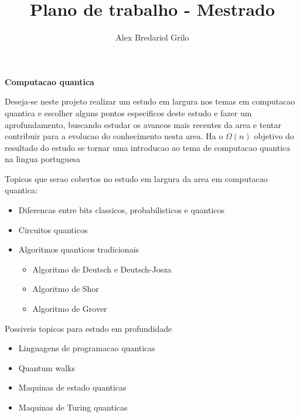 \documentclass[a4paper,10pt]{article}
\title{Plano de trabalho - Mestrado}
\author{Alex Bredariol Grilo}
\begin{document}
\maketitle

\textbf{Computacao quantica}

Deseja-se neste projeto realizar um estudo em largura nos temas em computacao quantica e
escolher alguns pontos especificos deste estudo e fazer um aprofundamento, buscando
estudar os avancos mais recentes da area e tentar contribuir para a
evolucao do conhecimento nesta area. Ha o $ \Omega(n) $ objetivo do resultado do estudo se tornar uma introducao ao tema de computacao
quantica na lingua portuguesa

Topicos que serao cobertos no estudo em largura da area em computacao quantica:

\begin{itemize}
\item Diferencas entre bits classicos, probabilisticos e quanticos
\item Circuitos quanticos
\item Algoritmos quanticos tradicionais
 \begin{itemize}
 \item Algoritmo de Deutsch e Deutsch-Josza
 \item Algoritmo de Shor
 \item Algoritmo de Grover
 \end{itemize}
\end{itemize}

Possiveis topicos para estudo em profundidade
\begin{itemize}
\item Linguagens de programacao quanticas
\item Quantum walks
\item Maquinas de estado quanticas
\item Maquinas de Turing quanticas
\end{itemize}
\end{document}
